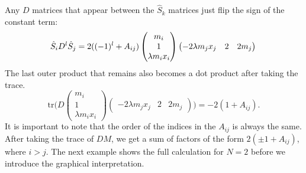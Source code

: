 \documentclass[english,master]{liumaiex}
\theoremstyle{thesisplain}
\theoremstyle{thesisdefinition}
\newcommand{\tr}{\text{tr}}
\numberwithin{equation}{section}
\begin{document}
Any $D$ matrices that appear between the $\hat{S}_k$ matrices just flip the sign of the constant term:
\begin{equation}
	\hat{S}_i D^l \hat{S}_j
	= 2((-1)^l + A_{ij})
	\begin{pmatrix}
		m_i \\ 1 \\ \lambda m_i x_i
	\end{pmatrix}
	\begin{pmatrix}
		-2\lambda m_j x_j & 2 & 2 m_j
	\end{pmatrix} \\
\end{equation}
The last outer product that remains also becomes a dot product after taking the trace.
\begin{equation}
	\tr \Big(
	D
	\begin{pmatrix}
		m_i \\ 1 \\ \lambda m_i x_i
	\end{pmatrix}
	\begin{pmatrix}
		-2\lambda m_j x_j & 2 & 2 m_j
	\end{pmatrix}
	\Big)
	= -2(1 + A_{ij}).
\end{equation}
It is important to note that the order of the indices in the $A_{ij}$ is always the same. After taking the trace of $DM$, we get a sum of factors of the form $2(\pm1 + A_{ij})$, where $i > j$.
%
The next example shows the full calculation for $N=2$ before we introduce the graphical interpretation.
%
\end{document}
